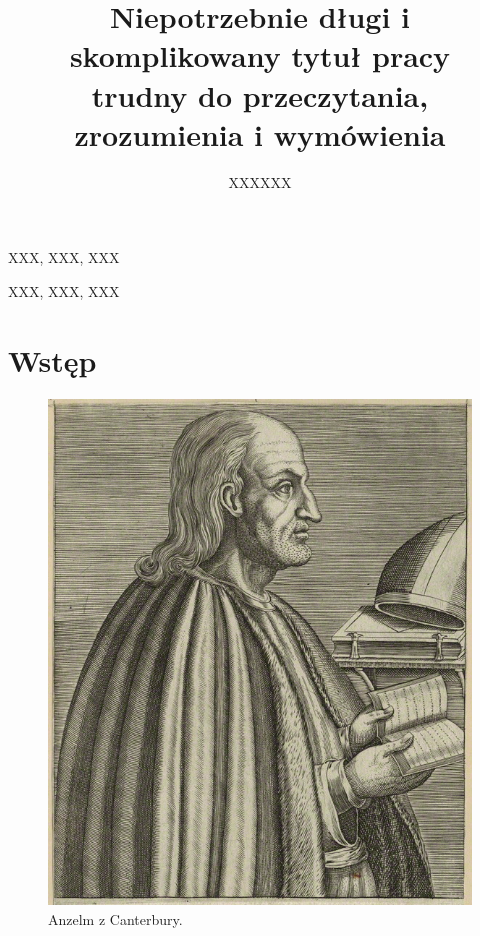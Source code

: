 \documentclass{eiti/eiti-mgr}
\begin{document}
\title{Niepotrzebnie długi i skomplikowany tytuł pracy \\ trudny do przeczytania, zrozumienia i wymówienia}
\author{XXXXXX}
\date{\the\year}
\maketitle

\streszczenie \lipsum[1-3]
\slowakluczowe XXX, XXX, XXX
\newpage

\abstract \kant[1-3]
\keywords XXX, XXX, XXX
\newpage

\makeauthorship
\newpage

\thispagestyle{plain}
\tableofcontents
\newpage


\section{Wstęp}
\lipsum[1-2] \cite{greenwade93}
\begin{figure}[h]
	\label{fig:anzelm}
	\centering \includegraphics[width=0.7\linewidth]{img/anzelm.png}
	\caption{Anzelm z Canterbury.}
\end{figure}
\lipsum[3-4]
\end{document}
